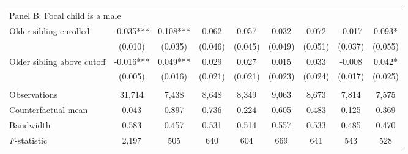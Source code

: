 {{\begin{tabular}{lcccccccc}
&  &  &  & & & & & \\
\multicolumn{10}{l}{Panel B: Focal child is a male} \\
Older sibling enrolled&      -0.035***&       0.108***&       0.062   &       0.057   &       0.032   &       0.072   &      -0.017   &       0.093*  \\
                    &     (0.010)   &     (0.035)   &     (0.046)   &     (0.045)   &     (0.049)   &     (0.051)   &     (0.037)   &     (0.055)   \\
 
Older sibling above cutoff&      -0.016***&       0.049***&       0.029   &       0.027   &       0.015   &       0.033   &      -0.008   &       0.042*  \\
                    &     (0.005)   &     (0.016)   &     (0.021)   &     (0.021)   &     (0.023)   &     (0.024)   &     (0.017)   &     (0.025)   \\
                    &               &               &               &               &               &               &               &               \\
Observations        &      31,714   &       7,438   &       8,648   &       8,349   &       9,063   &       8,673   &       7,814   &       7,575   \\
Counterfactual mean &       0.043   &       0.897   &       0.736   &       0.224   &       0.605   &       0.483   &       0.125   &       0.369   \\
Bandwidth           &       0.583   &       0.457   &       0.531   &       0.514   &       0.557   &       0.533   &       0.485   &       0.470   \\
\textit{F}-statistic&       2,197   &         505   &         640   &         604   &         669   &         641   &         543   &         528   \\
 

\bottomrule
\end{tabular}
}
}
